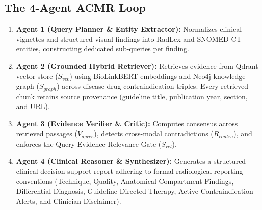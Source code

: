 \documentclass[journal,10pt,twocolumn]{IEEEtran}
\begin{document}
\subsection{The 4-Agent ACMR Loop}
\begin{enumerate}
    \item \textbf{Agent 1 (Query Planner \& Entity Extractor):} Normalizes clinical vignettes and structured visual findings into RadLex \cite{langlotz2006radlex} and SNOMED-CT \cite{snomedct2021} entities, constructing dedicated sub-queries per finding.
    \item \textbf{Agent 2 (Grounded Hybrid Retriever):} Retrieves evidence from Qdrant \cite{qdrant2023} vector store ($S_{vec}$) using BioLinkBERT \cite{yasunaga2022biolinkbert} embeddings and Neo4j \cite{neo4j2023} knowledge graph ($S_{graph}$) across disease-drug-contraindication triples. Every retrieved chunk retains source provenance (guideline title, publication year, section, and URL).
    \item \textbf{Agent 3 (Evidence Verifier \& Critic):} Computes consensus across retrieved passages ($V_{agree}$), detects cross-modal contradictions ($R_{contra}$), and enforces the Query-Evidence Relevance Gate ($S_{rel}$).
    \item \textbf{Agent 4 (Clinical Reasoner \& Synthesizer):} Generates a structured clinical decision support report adhering to formal radiological reporting conventions (Technique, Quality, Anatomical Compartment Findings, Differential Diagnosis, Guideline-Directed Therapy, Active Contraindication Alerts, and Clinician Disclaimer).
\end{enumerate}
\end{document}
